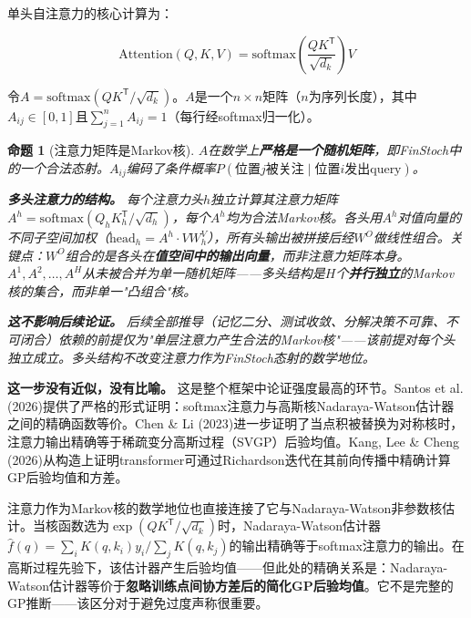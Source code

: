 \documentclass[11pt,a4paper]{ctexart}
\newtheorem{proposition}[theorem]{命题}
\begin{document}
单头自注意力的核心计算为：

\begin{equation}
    \mathrm{Attention}(Q,K,V) = \mathrm{softmax}\!\left(\frac{QK^{\mathsf{T}}}{\sqrt{d_k}}\right)V
    \label{eq:attention}
\end{equation}

令$A = \mathrm{softmax}(QK^{\mathsf{T}}/\sqrt{d_k})$。$A$是一个$n \times n$矩阵（$n$为序列长度），其中$A_{ij} \in [0,1]$且$\sum_{j=1}^{n} A_{ij} = 1$（每行经softmax归一化）。

\begin{proposition}[注意力矩阵是Markov核]
    $A$在数学上\textbf{严格是一个随机矩阵}，即FinStoch中的一个合法态射。$A_{ij}$编码了条件概率$P(\text{位置}j\text{被关注} \mid \text{位置}i\text{发出query})$。

\textbf{多头注意力的结构。} 每个注意力头$h$独立计算其注意力矩阵$A^h = \mathrm{softmax}(Q_h K_h^{\mathsf{T}}/\sqrt{d_h})$，每个$A^h$均为合法Markov核。各头用$A^h$对值向量的不同子空间加权（$\mathrm{head}_h = A^h \cdot V W_h^V$），所有头输出被拼接后经$W^O$做线性组合。关键点：$W^O$组合的是各头在\textbf{值空间中的输出向量}，而非注意力矩阵本身。$A^1, A^2, \dots, A^H$从未被合并为单一随机矩阵——多头结构是$H$个\textbf{并行独立}的Markov核的集合，而非单一"凸组合"核。

\textbf{这不影响后续论证。} 后续全部推导（记忆二分、测试收敛、分解决策不可靠、不可闭合）依赖的前提仅为"单层注意力产生合法的Markov核"——该前提对每个头独立成立。多头结构不改变注意力作为FinStoch态射的数学地位。
\end{proposition}

\textbf{这一步没有近似，没有比喻。} 这是整个框架中论证强度最高的环节。Santos et al. (2026)\cite{Santos2026Sparse}提供了严格的形式证明：softmax注意力与高斯核Nadaraya-Watson估计器之间的精确函数等价。Chen \& Li (2023)\cite{Chen2023SGPA}进一步证明了当点积被替换为对称核时，注意力输出精确等于稀疏变分高斯过程（SVGP）后验均值。Kang, Lee \& Cheng (2026)\cite{Kang2026PPD}从构造上证明transformer可通过Richardson迭代在其前向传播中精确计算GP后验均值和方差。

注意力作为Markov核的数学地位也直接连接了它与Nadaraya-Watson非参数核估计。当核函数选为$\exp(QK^{\mathsf{T}}/\sqrt{d_k})$时，Nadaraya-Watson估计器$\hat{f}(q) = \sum_i K(q, k_i)y_i / \sum_j K(q, k_j)$的输出精确等于softmax注意力的输出\cite{Santos2026Sparse}。在高斯过程先验下，该估计器产生后验均值——但此处的精确关系是：Nadaraya-Watson估计器等价于\textbf{忽略训练点间协方差后的简化GP后验均值}。它不是完整的GP推断——该区分对于避免过度声称很重要。
\end{document}
